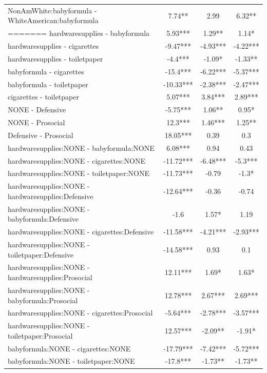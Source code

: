 \documentclass[]{report}
\begin{document}
\begin{longtable}{lccc}
		NonAmWhite:babyformula - WhiteAmerican:babyformula & 7.74** & 2.99 & 6.32** \\ 
=======
			hardwaresupplies - babyformula & 5.93*** & 1.29** & 1.14* \\ 
			hardwaresupplies - cigarettes & -9.47*** & -4.93*** & -4.22*** \\ 
			hardwaresupplies - toiletpaper & -4.4*** & -1.09* & -1.33** \\ 
			babyformula - cigarettes & -15.4*** & -6.22*** & -5.37*** \\ 
			babyformula - toiletpaper & -10.33*** & -2.38*** & -2.47*** \\ 
			cigarettes - toiletpaper & 5.07*** & 3.84*** & 2.89*** \\ 
			NONE - Defensive & -5.75*** & 1.06** & 0.95* \\ 
			NONE - Prosocial & 12.3*** & 1.46*** & 1.25** \\ 
			Defensive - Prosocial & 18.05*** & 0.39 & 0.3 \\ 
			hardwaresupplies:NONE - babyformula:NONE & 6.08*** & 0.94 & 0.43 \\ 
			hardwaresupplies:NONE - cigarettes:NONE & -11.72*** & -6.48*** & -5.3*** \\ 
			hardwaresupplies:NONE - toiletpaper:NONE & -11.73*** & -0.79 & -1.3* \\ 
			hardwaresupplies:NONE - hardwaresupplies:Defensive & -12.64*** & -0.36 & -0.74 \\ 
			hardwaresupplies:NONE - babyformula:Defensive & -1.6 & 1.57* & 1.19 \\ 
			hardwaresupplies:NONE - cigarettes:Defensive & -11.58*** & -4.21*** & -2.93*** \\ 
			hardwaresupplies:NONE - toiletpaper:Defensive & -14.58*** & 0.93 & 0.1 \\ 
			hardwaresupplies:NONE - hardwaresupplies:Prosocial & 12.11*** & 1.69* & 1.63* \\ 
			hardwaresupplies:NONE - babyformula:Prosocial & 12.78*** & 2.67*** & 2.69*** \\ 
			hardwaresupplies:NONE - cigarettes:Prosocial & -5.64*** & -2.78*** & -3.57*** \\ 
			hardwaresupplies:NONE - toiletpaper:Prosocial & 12.57*** & -2.09** & -1.91* \\ 
			babyformula:NONE - cigarettes:NONE & -17.79*** & -7.42*** & -5.72*** \\ 
			babyformula:NONE - toiletpaper:NONE & -17.8*** & -1.73** & -1.73** \\ 

\end{longtable}
\end{document}
